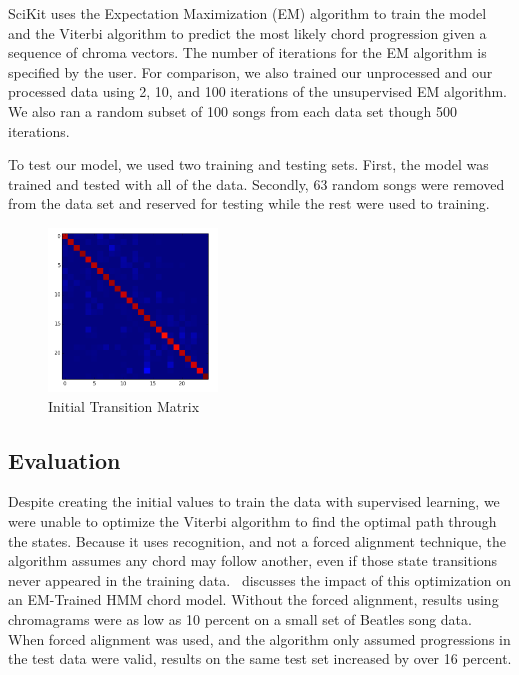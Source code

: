 \documentclass{article}
\begin{document}
SciKit uses the Expectation Maximization (EM) algorithm to train the model and the 
Viterbi algorithm to predict the most likely chord progression given a sequence
of chroma vectors. The number of iterations for the EM algorithm is specified by the user. For
comparison, we also trained our unprocessed and our processed data using 2,
10, and 100 iterations of the unsupervised EM algorithm. We also ran a random 
subset of 100 songs from each data set though 500 iterations.

To test our model, we used two training and testing sets. First, the model was trained
and tested with all of the data. Secondly, 63 random songs were removed from the data
set and reserved for testing while the rest were used to training. 

\begin{figure}
   \centering
   \includegraphics[width=0.4\textwidth]{trans-h.png}
   \caption{Initial Transition Matrix}\label{fig:transmath}
\end{figure}

\subsection{Evaluation}

Despite creating the initial values to train the data with supervised learning,
we were unable to optimize the Viterbi algorithm to find the optimal path
through the states. Because it uses recognition, and not a forced alignment
technique, the algorithm assumes any chord may follow another, even if those
state transitions never appeared in the training data.~\cite{Danellis:23}
discusses the impact of this optimization on an EM-Trained HMM chord model.
Without the forced alignment, results using chromagrams were as low as 10
percent on a small set of Beatles song data. When forced alignment was used,
and the algorithm only assumed progressions in the test data were valid,
results on the same test set increased by over 16 percent.
\end{document}
